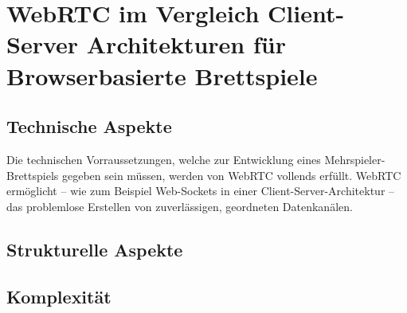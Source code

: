 \section{WebRTC im Vergleich Client-Server Architekturen für Browserbasierte Brettspiele}

\subsection{Technische Aspekte}
Die technischen Vorraussetzungen, welche zur Entwicklung eines Mehrspieler-Brettspiels gegeben sein müssen, werden von WebRTC vollends erfüllt. WebRTC ermöglicht -- wie zum Beispiel Web-Sockets in einer Client-Server-Architektur -- das problemlose Erstellen von zuverlässigen, geordneten Datenkanälen.

\subsection{Strukturelle Aspekte}

\subsection{Komplexität}

